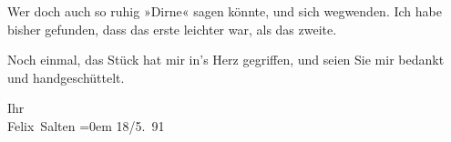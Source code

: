 \pstart
           Wer doch auch so ruhig »Dirne« sagen könnte, und sich wegwenden. Ich habe bisher
               gefunden, dass das erste {\pb}leichter war, als das zweite.\pend
           
\pstart
           Noch einmal, das Stück hat mir
               in’s Herz gegriffen, und seien Sie mir bedankt und handgeschüttelt.\pend
           
\pstart
           Ihr{\\[\baselineskip]}\spacefill\mbox{Felix Salten}\pend
           \leftskip=0em{}
\pstart
           \raggedleft{}18/5. 91\pend
           \endnumbering{}  
      